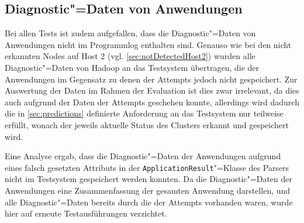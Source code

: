 \subsection{Diagnostic"=Daten von Anwendungen}
\label{sec:notSavedAppDiagnostics}

Bei allen Tests ist zudem aufgefallen, dass die Diagnostic"=Daten von Anwendungen nicht im Programmlog enthalten sind.
Genauso wie bei den nicht erkannten Nodes auf Host 2 (vgl. \autoref{sec:notDetectedHost2}) wurden alle Diagnostic"=Daten von Hadoop an das Testsystem übertragen, die der Anwendungen im Gegensatz zu denen der Attempts jedoch nicht gespeichert.
Zur Auswertung der Daten im Rahmen der Evaluation ist dies zwar irrelevant, da dies auch aufgrund der Daten der Attempts geschehen konnte, allerdings wird dadurch die in \autoref{sec:predictions} definierte Anforderung an das Testsystem nur teilweise erfüllt, wonach der jeweils aktuelle Status des Clusters erkannt und gespeichert wird.

Eine Analyse ergab, dass die Diagnostic"=Daten der Anwendungen aufgrund eines falsch gesetzten Attributs in der \texttt{ApplicationResult}"=Klasse des Parsers nicht im Testsystem gespeichert werden konnten. 
Da die Diagnostic"=Daten der Anwendungen eine Zusammenfassung der gesamten Anwendung darstellen, und alle Diagnostic"=Daten bereits durch die der Attempts vorhanden waren, wurde hier auf erneute Testausführungen verzichtet.
